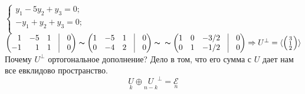 $\left\{
\begin{aligned}
y_1-5y_2+y_3=0;\\
-y_1+y_2+y_3=0;\\
\end{aligned}
\right.$ \:\:\:
$\begin{pmatrix*}[r]
1 & -5 & 1 & \vrule & 0\\
-1 & 1 & 1 & \vrule & 0\\
\end{pmatrix*}
\thicksim
\begin{pmatrix*}[r]
1 & -5 & 1 & \vrule & 0\\
0 & -4 & 2 & \vrule & 0\\
\end{pmatrix*}
\thicksim \\
\thicksim
\begin{pmatrix*}[r]
1 & 0 & -3/2 & \vrule & 0\\
0 & 1 & -1/2 & \vrule & 0\\
\end{pmatrix*}
\Rightarrow
U^{\perp}=
\langle \left(
\begin{smallmatrix*}[r]
3\\ 1\\ 2\\ 
\end{smallmatrix*}
\right) \rangle $\\

Почему $U^{\perp}$ ортогональное дополнение? Дело в том, что его сумма с $U$ дает нам все евклидово пространство.\\
$$\underset{k}U\oplus \underset{n-k}U^{\perp}= \underset{n}{\mathcal{E}}$$
